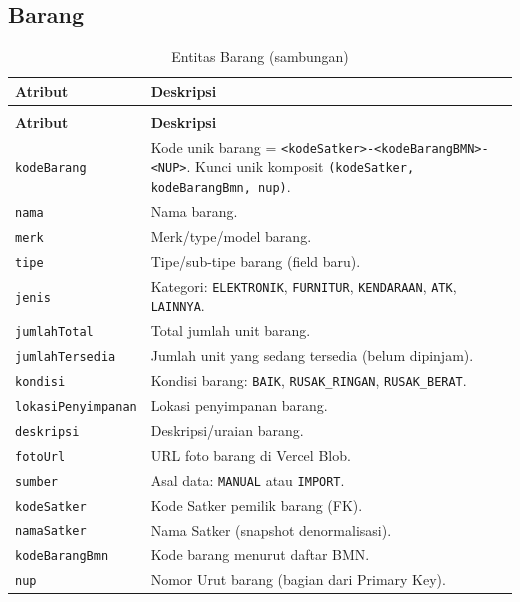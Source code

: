 \documentclass[
  12pt,
  a4paper,
  oneside,
  final
]{report}
\begin{document}
\subsection{Barang}

\begin{longtable}[!htbp]{p{3.5cm} p{9cm}}
  \caption{Entitas Barang}
  \label{tab:entitas-barang} \\
  \toprule
  \textbf{Atribut} & \textbf{Deskripsi} \\
  \midrule
  \endfirsthead
  \caption[]{Entitas Barang (sambungan)} \\
  \toprule
  \textbf{Atribut} & \textbf{Deskripsi} \\
  \midrule
  \endhead
  \bottomrule
  \endfoot

  \texttt{kodeBarang}       & Kode unik barang = \texttt{<kodeSatker>-<kodeBarangBMN>-<NUP>}.
                              Kunci unik komposit \texttt{(kodeSatker,
                              kodeBarangBmn, nup)}. \\
  \texttt{nama}             & Nama barang. \\
  \texttt{merk}             & Merk/type/model barang. \\
  \texttt{tipe}             & Tipe/sub-tipe barang (field baru). \\
  \texttt{jenis}            & Kategori: \texttt{ELEKTRONIK}, \texttt{FURNITUR},
                              \texttt{KENDARAAN}, \texttt{ATK}, \texttt{LAINNYA}. \\
  \texttt{jumlahTotal}      & Total jumlah unit barang. \\
  \texttt{jumlahTersedia}   & Jumlah unit yang sedang tersedia (belum dipinjam). \\
  \texttt{kondisi}          & Kondisi barang: \texttt{BAIK}, \texttt{RUSAK\_RINGAN},
                              \texttt{RUSAK\_BERAT}. \\
  \texttt{lokasiPenyimpanan}& Lokasi penyimpanan barang. \\
  \texttt{deskripsi}        & Deskripsi/uraian barang. \\
  \texttt{fotoUrl}          & URL foto barang di Vercel Blob. \\
  \texttt{sumber}           & Asal data: \texttt{MANUAL} atau \texttt{IMPORT}. \\
  \texttt{kodeSatker}       & Kode Satker pemilik barang (FK). \\
  \texttt{namaSatker}       & Nama Satker (snapshot denormalisasi). \\
  \texttt{kodeBarangBmn}    & Kode barang menurut daftar BMN. \\
  \texttt{nup}              & Nomor Urut barang (bagian dari Primary Key). \\
\end{longtable}
\end{document}
